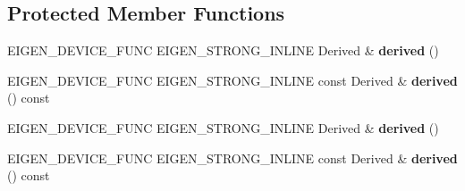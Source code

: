 \subsection*{Protected Member Functions}
\begin{DoxyCompactItemize}
\item 
\mbox{\label{class_eigen_1_1_tensor_base_aa039c491d3323f602a3066e6cbaa98d4}} 
E\+I\+G\+E\+N\+\_\+\+D\+E\+V\+I\+C\+E\+\_\+\+F\+U\+NC E\+I\+G\+E\+N\+\_\+\+S\+T\+R\+O\+N\+G\+\_\+\+I\+N\+L\+I\+NE Derived \& {\bfseries derived} ()
\item 
\mbox{\label{class_eigen_1_1_tensor_base_aac0b7f016daa0ba9a7af336e60d0bbd0}} 
E\+I\+G\+E\+N\+\_\+\+D\+E\+V\+I\+C\+E\+\_\+\+F\+U\+NC E\+I\+G\+E\+N\+\_\+\+S\+T\+R\+O\+N\+G\+\_\+\+I\+N\+L\+I\+NE const Derived \& {\bfseries derived} () const
\item 
\mbox{\label{class_eigen_1_1_tensor_base_aa039c491d3323f602a3066e6cbaa98d4}} 
E\+I\+G\+E\+N\+\_\+\+D\+E\+V\+I\+C\+E\+\_\+\+F\+U\+NC E\+I\+G\+E\+N\+\_\+\+S\+T\+R\+O\+N\+G\+\_\+\+I\+N\+L\+I\+NE Derived \& {\bfseries derived} ()
\item 
\mbox{\label{class_eigen_1_1_tensor_base_aac0b7f016daa0ba9a7af336e60d0bbd0}} 
E\+I\+G\+E\+N\+\_\+\+D\+E\+V\+I\+C\+E\+\_\+\+F\+U\+NC E\+I\+G\+E\+N\+\_\+\+S\+T\+R\+O\+N\+G\+\_\+\+I\+N\+L\+I\+NE const Derived \& {\bfseries derived} () const
\end{DoxyCompactItemize}
